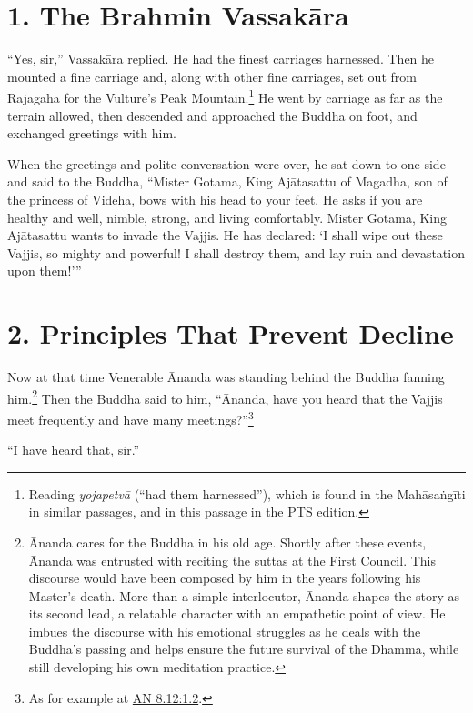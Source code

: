 \documentclass[12pt,openany]{book}%
\begin{document}
\section*{1. The Brahmin \textsanskrit{Vassakāra} }

“Yes, sir,” \textsanskrit{Vassakāra} replied. He had the finest carriages harnessed. Then he mounted a fine carriage and, along with other fine carriages, set out from \textsanskrit{Rājagaha} for the Vulture’s Peak Mountain.\footnote{Reading \textit{\textsanskrit{yojapetvā}} (“had them harnessed”), which is found in the \textsanskrit{Mahāsaṅgīti} in similar passages, and in this passage in the PTS edition. } He went by carriage as far as the terrain allowed, then descended and approached the Buddha on foot, and exchanged greetings with him. 

When the greetings and polite conversation were over, he sat down to one side and said to the Buddha, “Mister Gotama, King \textsanskrit{Ajātasattu} of Magadha, son of the princess of Videha, bows with his head to your feet. He asks if you are healthy and well, nimble, strong, and living comfortably. Mister Gotama, King \textsanskrit{Ajātasattu} wants to invade the Vajjis. He has declared: ‘I shall wipe out these Vajjis, so mighty and powerful! I shall destroy them, and lay ruin and devastation upon them!’” 

\section*{2. Principles That Prevent Decline }

Now at that time Venerable Ānanda was standing behind the Buddha fanning him.\footnote{Ānanda cares for the Buddha in his old age. Shortly after these events, Ānanda was entrusted with reciting the suttas at the First Council. This discourse would have been composed by him in the years following his Master’s death. More than a simple interlocutor, Ānanda shapes the story as its second lead, a relatable character with an empathetic point of view. He imbues the discourse with his emotional struggles as he deals with the Buddha’s passing and helps ensure the future survival of the Dhamma, while still developing his own meditation practice. } Then the Buddha said to him, “Ānanda, have you heard that the Vajjis meet frequently and have many meetings?”\footnote{As for example at \href{https://suttacentral.net/an8.12/en/sujato\#1.2}{AN 8.12:1.2}. } 

“I have heard that, sir.” 
\end{document}
